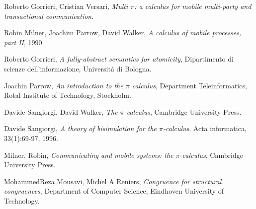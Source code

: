 \begin{thebibliography}{99}

  Roberto Gorrieri, Cristian Versari,
  \emph{Multi $\pi$: a calculus for mobile multi-party and transactional communication}.


  Robin Milner, Joachim Parrow, David Walker,
  \emph{A calculus of mobile processes, part II},
  1990.


  Roberto Gorrieri,
  \emph{A fully-abstract semantics for atomicity},
  Dipartimento di scienze dell'informazione, 
  Universit\'a di Bologna.


  Joachin Parrow, 
  \emph{An introduction to the $\pi$ calculus},
  Department Teleinformatics,
  Rotal Institute of Technology,
  Stockholm.


  Davide Sangiorgi, David Walker,
  \emph{The $\pi$-calculus},
  Cambridge University Press.

  Davide Sangiorgi,
  \emph{A theory of bisimulation for the $\pi$-calculus},
  Acta informatica, 33(1):69-97, 1996.



  Milner, Robin, 
  \emph{Communicating and mobile systems: the $\pi$-calculus},
  Cambridge University Press.

  MohammedReza Mousavi, Michel A Reniers,
  \emph{Congruence for structural congruences},
  Department of Computer Science,
  Eindhoven University of Technology.



\end{thebibliography}

